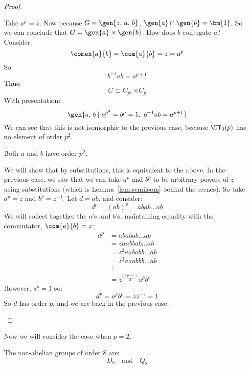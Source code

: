 \begin{proof}
\begin{case}
        Take \(a^p = z\).
        Now because \(G = \gen{z,\,a,\,b}\), \(\gen{a} \cap \gen{b} = \bm{1}\).
        So we can conclude that \(G = \gen{a} \rtimes \gen{b}\).
        How does \(b\) conjugate \(a\)?
        Consider:
        \[\comex{a}{b} = \com{a}{b} = z = a^p\]
        So:
        \[b^{-1}ab = a^{p + 1}\]
        Thus:
        \[G \cong C_{p^2} \rtimes C_p\]
        With presentation:
        \[\gen{a,\,b \mid a^{p^2} = b^p = 1,\ b^{-1}ab = a^{p + 1}}\]
        We can see that this is not isomorphic to the previous case, because \(\UT_3(p)\) has no element of order \(p^2\).

    \item Both \(a\) and \(b\) have order \(p^2\).

        We will show that by substitutions, this is equivalent to the above.
        In the previous case, we saw that we can take \(a^p\) and \(b^p\) to be arbitrary powers of \(z\) using
        substitutions (which is Lemma~\ref{lem:semiisom} behind the scenes).
        So take \(a^p = z\) and \(b^p = z^{-1}\).
        Let \(d = ab\), and consider:
        \[ d^p = {(ab)}^p = abab\ldots ab\]
        We will collect together the \(a\)'s and \(b\)'s, maintaining equality with the commutator, \(\com{a}{b} = z\):
        \begin{align*}
            d^p &= ababab\ldots ab \\
            &= z aabbab\ldots ab \\
            &= z^2 aababb\ldots ab \\
            &= z^3 aaabbb\ldots ab \\
            &\ \,\vdots \\  %
            &= z^{\frac{p(p-1)}{2}} a^p b^p \tag{\ddag} \label{eqn:p_cubed_ddag}
        \end{align*}
        However, \(z^p = 1\) so:
        \[d^p = a^p b^p = zz^{-1} = 1\]
        So \(d\) has order \(p\), and we are back in the previous case.
\end{case}
\end{proof}

Now we will consider the case when \(p = 2\).
\begin{lemma}
    The non-abelian groups of order 8 are:
    \[%
        D_8 \quad \text{and} \quad%
        Q_8
    \]
\end{lemma}

